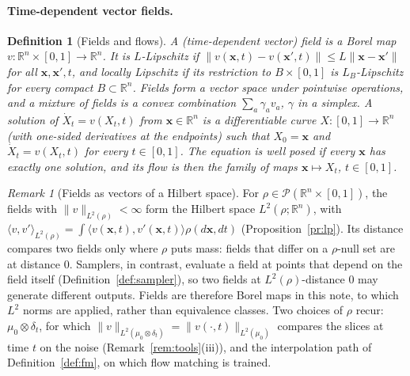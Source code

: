 \documentclass{article}
\newcommand{\RR}{\mathbb{R}}
\newcommand{\bx}{\mathbf{x}}
\theoremstyle{plain}
\newtheorem{definition}[theorem]{Definition}
\theoremstyle{remark}
\newtheorem{remark}[theorem]{Remark}
\begin{document}
\paragraph{Time-dependent vector fields.}

\begin{definition}[Fields and flows]\label{def:fields}
A (time-dependent vector) \emph{field} is a Borel map $v:\RR^n\times[0,1]\to\RR^n$. It is \emph{$L$-Lipschitz} if $\|v(\bx,t)-v(\bx',t)\|\le L\|\bx-\bx'\|$
for all $\bx,\bx',t$, and \emph{locally Lipschitz} if its restriction to $B\times[0,1]$ is $L_B$-Lipschitz for every compact $B\subset\RR^n$. Fields
form a vector space under pointwise operations, and a \emph{mixture} of fields is a convex combination $\sum_a\gamma_av_a$, $\gamma$ in a
simplex. A \emph{solution} of $\dot X_t=v(X_t,t)$ from $\bx\in\RR^n$ is a differentiable curve $X:[0,1]\to\RR^n$ (with one-sided derivatives at
the endpoints) such that $X_0=\bx$ and $\dot X_t=v(X_t,t)$ for every $t\in[0,1]$. The equation is \emph{well posed} if every $\bx$ has exactly
one solution, and its \emph{flow} is then the family of maps $\bx\mapsto X_t$, $t\in[0,1]$.
\end{definition}

\begin{remark}[Fields as vectors of a Hilbert space]\label{rem:fields_hilbert}
For $\rho\in\mathcal P(\RR^n\times[0,1])$, the fields with $\|v\|_{L^2(\rho)}<\infty$ form the Hilbert space $L^2(\rho;\RR^n)$, with
$\langle v,v'\rangle_{L^2(\rho)}=\int\langle v(\bx,t),v'(\bx,t)\rangle\rho(d\bx,dt)$ (Proposition~\ref{pr:lp}). Its distance compares two fields only where $\rho$
puts mass: fields that differ on a $\rho$-null set are at distance $0$. Samplers, in contrast, evaluate a field at points that depend on
the field itself (Definition~\ref{def:sampler}), so two fields at $L^2(\rho)$-distance $0$ may generate different outputs. Fields are
therefore Borel maps in this note, to which $L^2$ norms are applied, rather than equivalence classes. Two choices of $\rho$ recur:
$\mu_0\otimes\delta_t$, for which $\|v\|_{L^2(\mu_0\otimes\delta_t)}=\|v(\cdot,t)\|_{L^2(\mu_0)}$ compares the slices at time $t$ on the noise
(Remark~\ref{rem:tools}(iii)), and the interpolation path of Definition~\ref{def:fm}, on which flow matching is trained.
\end{remark}
\end{document}
